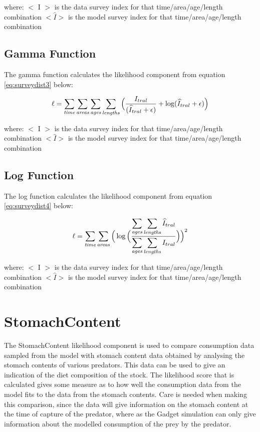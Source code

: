 \documentclass[]{book}
\begin{document}
where: \(<\) I \(>\) is the data survey index for that time/area/age/length
combination \(<\widehat{I}>\) is the model survey index for that
time/area/age/length combination

\hypertarget{gamma-function-1}{%
\subsection{Gamma Function}\label{gamma-function-1}}

The gamma function calculates the likelihood component from
equation \eqref{eq:surveydist3} below:

\begin{equation}
\label{eq:surveydist3}
\ell = \sum_{\it time}\sum_{\it areas}\sum_{\it ages}\sum_{\it lengths} \Big( {\frac{ I_{tral}} { (\widehat{I}_{tral} + \epsilon )} + \log ({\widehat{I}_{tral} + \epsilon}}) \Big)\end{equation}

where: \(<\) I \(>\) is the data survey index for that time/area/age/length
combination \(<\widehat{I}>\) is the model survey index for that
time/area/age/length combination

\hypertarget{log-function-1}{%
\subsection{Log Function}\label{log-function-1}}

The log function calculates the likelihood component from
equation \eqref{eq:surveydist4} below:

\begin{equation}
\label{eq:surveydist4}
\ell = \sum_{\it time}\sum_{\it areas} \Big(  \log \Big( {\frac{ \displaystyle \sum_{\it ages}\sum_{\it lengths}  \widehat{I}_{tral}} { \displaystyle \sum_{\it ages}\sum_{\it lengths} I_{tral}}} \Big) \Big) ^2\end{equation}

where: \(<\) I \(>\) is the data survey index for that time/area/age/length
combination \(<\widehat{I}>\) is the model survey index for that
time/area/age/length combination

\hypertarget{sec:stomach}{%
\section{StomachContent}\label{sec:stomach}}

The StomachContent likelihood component is used to compare consumption
data sampled from the model with stomach content data obtained by
analysing the stomach contents of various predators. This data can be
used to give an indication of the diet composition of the stock. The
likelihood score that is calculated gives some measure as to how well
the consumption data from the model fits to the data from the stomach
contents. Care is needed when making this comparison, since the data
will give information on the stomach content at the time of capture of
the predator, where as the Gadget simulation can only give information
about the modelled consumption of the prey by the predator.
\end{document}
